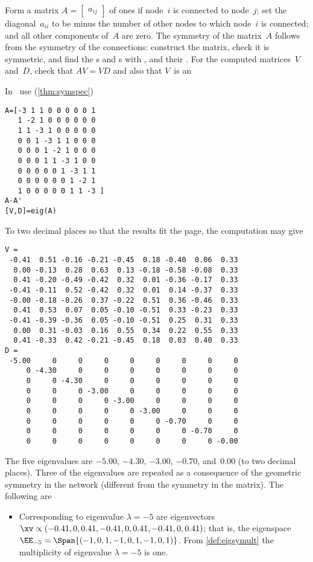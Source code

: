 \begin{example}
Form a matrix \(A=\begin{bmatrix} a_{ij} \end{bmatrix}\) of ones if node~\(i\) is connected to node~\(j\);  set the diagonal~\(a_{ii}\) to be minus the number of other nodes to which node~\(i\) is connected; and all other components of~\(A\) are zero.
The symmetry of the matrix~\(A\) follows from the symmetry of the connections: construct the matrix, check it is symmetric, and find the s and s with \script, and their .
For the computed matrices~\(V\) and~\(D\), check that \(AV=VD\) and also that \(V\)~is an 
\begin{solution} In \script\ use (\cref{thm:symspec})
\setbox\ajrqrbox\hbox{}%
\marginajrbox%
\begin{verbatim}
A=[-3 1 1 0 0 0 0 0 1
   1 -2 1 0 0 0 0 0 0
   1 1 -3 1 0 0 0 0 0
   0 0 1 -3 1 1 0 0 0
   0 0 0 1 -2 1 0 0 0
   0 0 0 1 1 -3 1 0 0
   0 0 0 0 0 1 -3 1 1
   0 0 0 0 0 0 1 -2 1
   1 0 0 0 0 0 1 1 -3 ]
A-A'
[V,D]=eig(A)
\end{verbatim}
To two decimal places so that the results fit the page, the computation may give
\begin{verbatim}
V =
 -0.41  0.51 -0.16 -0.21 -0.45  0.18 -0.40  0.06  0.33
  0.00 -0.13  0.28  0.63  0.13 -0.18 -0.58 -0.08  0.33
  0.41 -0.20 -0.49 -0.42  0.32  0.01 -0.36 -0.17  0.33
 -0.41 -0.11  0.52 -0.42  0.32  0.01  0.14 -0.37  0.33
 -0.00 -0.18 -0.26  0.37 -0.22  0.51  0.36 -0.46  0.33
  0.41  0.53  0.07  0.05 -0.10 -0.51  0.33 -0.23  0.33
 -0.41 -0.39 -0.36  0.05 -0.10 -0.51  0.25  0.31  0.33
  0.00  0.31 -0.03  0.16  0.55  0.34  0.22  0.55  0.33
  0.41 -0.33  0.42 -0.21 -0.45  0.18  0.03  0.40  0.33
D =
 -5.00     0     0     0     0     0     0     0     0
     0 -4.30     0     0     0     0     0     0     0
     0     0 -4.30     0     0     0     0     0     0
     0     0     0 -3.00     0     0     0     0     0
     0     0     0     0 -3.00     0     0     0     0
     0     0     0     0     0 -3.00     0     0     0
     0     0     0     0     0     0 -0.70     0     0
     0     0     0     0     0     0     0 -0.70     0
     0     0     0     0     0     0     0     0 -0.00
\end{verbatim}
The five eigenvalues are \(-5.00\), \(-4.30\), \(-3.00\), \(-0.70\), and~\(0.00\) (to two decimal places).
Three of the eigenvalues are repeated as a consequence of the geometric symmetry in the network (different from the symmetry in the matrix).
The following are 
\begin{itemize}
\item Corresponding to eigenvalue \(\lambda=-5\) are eigenvectors \(\sloppy\xv\propto(-0.41,0,0.41,-0.41,0,0.41,-0.41,0,0.41)\); that is, the eigenspace \(\EE_{-5}=\Span\{(-1,0,1,-1,0,1,-1,0,1)\}\).
From \cref{def:eigsymult} the multiplicity of eigenvalue \(\lambda=-5\) is one.


\end{itemize}
\end{solution}
\end{example}
